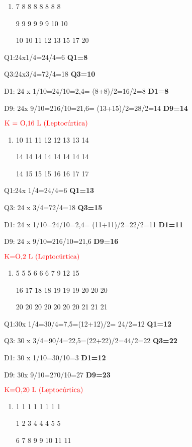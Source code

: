 \documentclass[]{book}
\begin{document}
\begin{enumerate}
\def\labelenumi{\alph{enumi})}
\item
  7 8 8 8 8 8 8 8

  9 9 9 9 9 9 10 10

  10 10 11 12 13 15 17 20
\end{enumerate}

Q1:24x1/4=24/4=6 \textbf{Q1=8}

Q3:24x3/4=72/4=18 \textbf{Q3=10}

D1: 24 x 1/10=24/10=2,4= (8+8)/2=16/2=8 \textbf{D1=8}

D9: 24x 9/10=216/10=21,6= (13+15)/2=28/2=14 \textbf{D9=14}

\(\color{red}{\text{K = O,16 L (Leptocúrtica)}}\)

\begin{enumerate}
\def\labelenumi{\alph{enumi})}
\setcounter{enumi}{1}
\item
  10 11 11 12 12 13 13 14

  14 14 14 14 14 14 14 14

  14 15 15 15 16 16 17 17
\end{enumerate}

Q1:24x 1/4=24/4=6 \textbf{Q1=13}

Q3: 24 x 3/4=72/4=18 \textbf{Q3=15}

D1: 24 x 1/10=24/10=2,4= (11+11)/2=22/2=11 \textbf{D1=11}

D9: 24 x 9/10=216/10=21,6 \textbf{D9=16}

\(\color{red}{\text{K=O,2  L (Leptocúrtica)}}\)

\begin{enumerate}
\def\labelenumi{\alph{enumi})}
\setcounter{enumi}{2}
\item
  5 5 5 6 6 6 7 9 12 15

  16 17 18 18 19 19 19 20 20 20

  20 20 20 20 20 20 20 21 21 21
\end{enumerate}

Q1:30x 1/4=30/4=7,5=(12+12)/2= 24/2=12 \textbf{Q1=12}

Q3: 30 x 3/4=90/4=22,5=(22+22)/2=44/2=22 \textbf{Q3=22}

D1: 30 x 1/10=30/10=3 \textbf{D1=12}

D9: 30x 9/10=270/10=27 \textbf{D9=23}

\(\color{red}{\text{K=O,20 L (Leptocúrtica)}}\)

\begin{enumerate}
\def\labelenumi{\alph{enumi})}
\setcounter{enumi}{3}
\item
  1 1 1 1 1 1 1 1

  1 2 3 4 4 4 5 5

  6 7 8 9 9 10 11 11
\end{enumerate}
\end{document}
